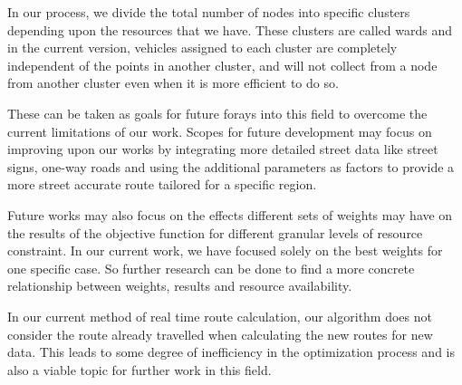 \documentclass[12pt]{article}
\begin{document}
In our process, we divide the total number of nodes into specific clusters depending upon the resources that we have. These clusters are called wards and in the current version, vehicles assigned to each cluster are completely independent of the points in another cluster, and will not collect from a node from another cluster even when it is more efficient to do so. 

These can be taken as goals for future forays into this field to overcome the current limitations of our work. Scopes for future development may focus on improving upon our works by integrating more detailed street data like street signs, one-way roads and using the additional parameters as factors to provide a more street accurate route tailored for a specific region.

Future works may also focus on the effects different sets of weights may have on the results of the objective function for different granular levels of resource constraint. In our current work, we have focused solely on the best weights for one specific case. So further research can be done to find a more concrete relationship between weights, results and resource availability. 

In our current method of real time route calculation, our algorithm does not consider the route already travelled when calculating the new routes for new data. This leads to some degree of inefficiency in the optimization process and is also a viable topic for further work in this field.
\end{document}
